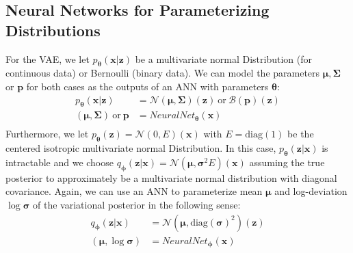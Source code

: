 \documentclass[12pt]{report}
\theoremstyle{definition}
\begin{document}
\subsection{Neural Networks for Parameterizing Distributions}
For the VAE, we let $p_{\pmb{\theta}}(\mathbf{x}|\mathbf{z})$ be a multivariate normal Distribution (for continuous data) or Bernoulli (binary data). We can model the parameters $\pmb{\mu}, \pmb{\Sigma}$ or $\mathbf{p}$ for both cases as the outputs of an ANN with parameters $\pmb{\theta}$:
\begin{equation}
\begin{split}
p_{\pmb{\theta}}(\mathbf{x}|\mathbf{z}) & = \mathcal{N}(\pmb{\mu}, \pmb{\Sigma})(\mathbf{z}) \ \mathrm{or} \ \mathcal{B}(\mathbf{p})(\mathbf{z}) \\
(\pmb{\mu}, \pmb{\Sigma}) \ \mathrm{or} \ \mathbf{p} & = NeuralNet_{\pmb{\theta}}(\mathbf{x}) \\
\end{split}
\end{equation}
Furthermore, we let $p_{\pmb{\theta}}(\mathbf{z})=\mathcal{N}(0, E)(\mathbf{x})$ with $E=\mathrm{diag}(1)$ be the centered isotropic multivariate normal Distribution. In this case,  $p_{\pmb{\theta}}(\mathbf{z}|\mathbf{x})$ is intractable and we choose $q_{\pmb{\phi}}(\mathbf{z}|\mathbf{x})=\mathcal{N}(\pmb{\mu}, \pmb{\sigma}^2 E)(\mathbf{x})$ assuming the true posterior to approximately be a multivariate normal distribution with diagonal covariance. Again, we can use an ANN to parameterize mean $\pmb{\mu}$ and log-deviation $\log \pmb{\sigma}$ of the variational posterior in the following sense:
\begin{equation}
\begin{split}
q_{\pmb{\phi}}(\mathbf{z}|\mathbf{x}) & = \mathcal{N}(\pmb{\mu}, \mathrm{diag}(\pmb{\sigma})^2)(\mathbf{z}) \\
(\pmb{\mu}, \log \pmb{\sigma}) & = NeuralNet_{\pmb{\phi}}(\mathbf{x}) \\
\end{split}
\end{equation}
\end{document}
